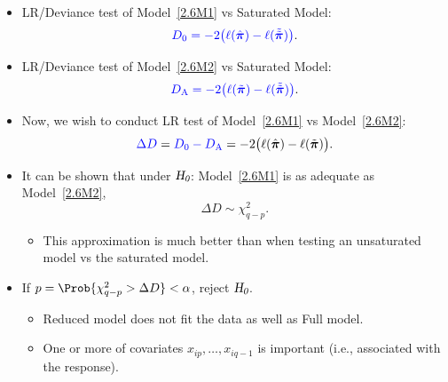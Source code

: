 \documentclass[oneside]{book}\usepackage[]{graphicx}\usepackage[svgnames]{xcolor}
\newcommand{\HN}{\textsl{H}_{\textsl{0}}}%
\providecommand{\Vector}[1]{\bm{#1}}%
\begin{document}
\begin{itemize}
      \item LR/Deviance test of Model~\ref{2.6M1} vs Saturated Model:
            \[ \textcolor{Blue}{D_0=-2\bigl(\ell(\hat{\Vector{\pi}})-\ell(\tilde{\tilde{\Vector{\pi}}})\bigr)}. \]
      \item LR/Deviance test of Model~\ref{2.6M2} vs Saturated Model:
            \[ \textcolor{Blue}{D_\text{A}=-2\bigl(\ell(\tilde{\Vector{\pi}})-\ell(\tilde{\tilde{\Vector{\pi}}})\bigr)}. \]
      \item Now, we wish to conduct LR test of Model~\ref{2.6M1} vs Model~\ref{2.6M2}:
            \[ \textcolor{Blue}{\Delta D} = \textcolor{Blue}{D_0-D_{\text{A}}}=-2\bigl(\ell(\hat{\Vector{\pi}})-\ell(\tilde{\Vector{\pi}})\bigr). \]
      \item It can be shown that under $ \HN $: Model~\ref{2.6M1} is as adequate as Model~\ref{2.6M2},
            \[ \Delta D \sim \chi^2_{q-p}. \]
            \begin{itemize}
                  \item This approximation is much better than when testing an unsaturated
                        model vs the saturated model.
            \end{itemize}
      \item If $ p=\Prob{\chi^2_{q-p}>\Delta D}<\alpha $, reject $ \HN $.
            \begin{itemize}
                  \item Reduced model does not fit the data as well as Full model.
                  \item One or more of covariates $ x_{ip},\ldots,x_{iq-1} $ is important (i.e., associated with the response).
            \end{itemize}
\end{itemize}
\end{document}
